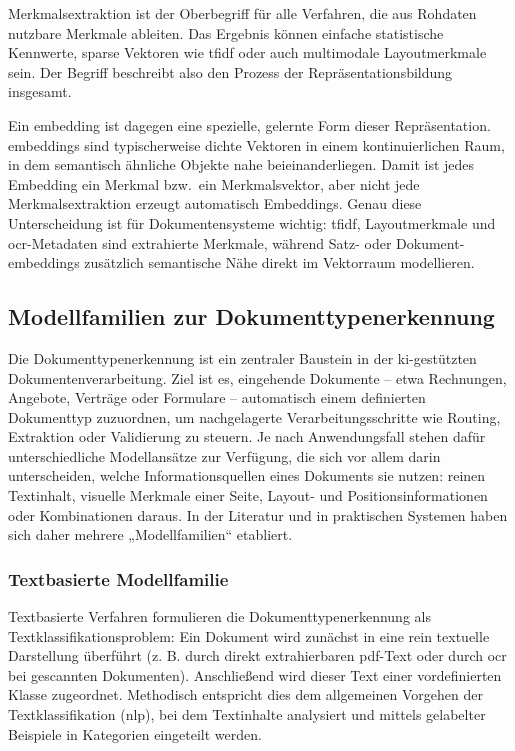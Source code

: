 Merkmalsextraktion ist der Oberbegriff für alle Verfahren, die aus Rohdaten nutzbare Merkmale ableiten. Das Ergebnis können einfache statistische Kennwerte, sparse Vektoren wie \acrshort{tfidf} oder auch multimodale Layoutmerkmale sein. Der Begriff beschreibt also den Prozess der Repräsentationsbildung insgesamt. \cite{sklearn_feature_extraction,stanford_tfidf}

Ein \gls{embedding} ist dagegen eine spezielle, gelernte Form dieser Repräsentation. \gls{embedding}s sind typischerweise dichte Vektoren in einem kontinuierlichen Raum, in dem semantisch ähnliche Objekte nahe beieinanderliegen. Damit ist jedes Embedding ein Merkmal bzw.\ ein Merkmalsvektor, aber nicht jede Merkmalsextraktion erzeugt automatisch Embeddings. Genau diese Unterscheidung ist für Dokumentensysteme wichtig: \acrshort{tfidf}, Layoutmerkmale und \acrshort{ocr}-Metadaten sind extrahierte Merkmale, während Satz- oder Dokument-\gls{embedding}s zusätzlich semantische Nähe direkt im Vektorraum modellieren. \cite{google_ml_glossary_embedding,mikolov2013word2vec,sentence_bert_2019}

\subsection{Modellfamilien zur Dokumenttypenerkennung}

Die Dokumenttypenerkennung ist ein zentraler Baustein in der \gls{ki}-gestützten Dokumentenverarbeitung. Ziel ist es, eingehende Dokumente – 
etwa Rechnungen, Angebote, Verträge oder Formulare – automatisch einem definierten Dokumenttyp zuzuordnen, um nachgelagerte Verarbeitungsschritte wie Routing, Extraktion oder Validierung zu steuern. 
Je nach Anwendungsfall stehen dafür unterschiedliche Modellansätze zur Verfügung, die sich vor allem darin unterscheiden, welche Informationsquellen eines Dokuments sie nutzen: reinen Textinhalt, visuelle Merkmale einer Seite, Layout- und Positionsinformationen oder Kombinationen daraus.
In der Literatur und in praktischen Systemen haben sich daher mehrere „Modellfamilien“ etabliert.

\subsubsection{Textbasierte Modellfamilie}

Textbasierte Verfahren formulieren die Dokumenttypenerkennung als Textklassifikationsproblem: Ein Dokument wird zunächst in eine rein textuelle Darstellung überführt (z. B. durch direkt extrahierbaren \acrshort{pdf}-Text oder durch \acrshort{ocr} bei gescannten Dokumenten). 
Anschließend wird dieser Text einer vordefinierten Klasse zugeordnet. Methodisch entspricht dies dem allgemeinen Vorgehen der Textklassifikation (\acrshort{nlp}), bei dem Textinhalte analysiert und mittels gelabelter Beispiele in Kategorien eingeteilt werden. \cite{elastic_textclassification}

